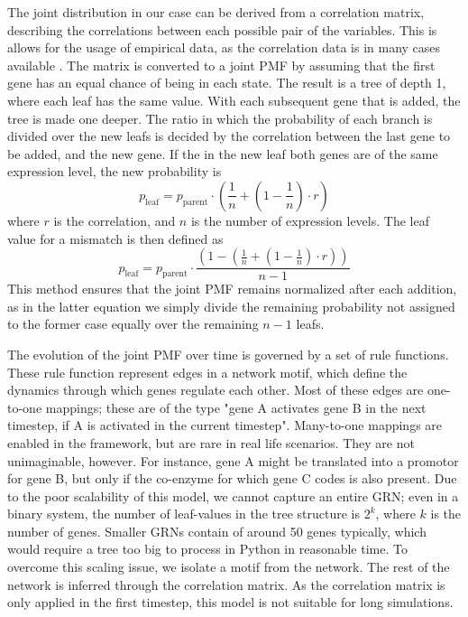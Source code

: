 \documentclass[../main.tex]{subfiles}
\begin{document}
The joint distribution in our case can be derived from a correlation matrix, describing the correlations between each possible pair of the variables.
This is allows for the usage of empirical data, as the correlation data is in many cases available \cite{}.
The matrix is converted to a joint PMF by assuming that the first gene has an equal chance of being in each state.
The result is a tree of depth 1, where each leaf has the same value.
With each subsequent gene that is added, the tree is made one deeper.
The ratio in which the probability of each branch is divided over the new leafs is decided by the correlation between the last gene to be added, and the new gene.
If the in the new leaf both genes are of the same expression level, the new probability is
%
\begin{equation}
    p_\mathrm{leaf} = p_\mathrm{parent} \cdot (\frac{1}{n} + (1 - \frac{1}{n}) \cdot r)
\end{equation}
%
where $r$ is the correlation, and $n$ is the number of expression levels.
The leaf value for a mismatch is then defined as
%
\begin{equation}
    p_\mathrm{leaf} = p_\mathrm{parent} \cdot \frac{(1 - (\frac{1}{n} + (1 - \frac{1}{n}) \cdot r))}{n-1} 
\end{equation}
%
This method ensures that the joint PMF remains normalized after each addition, as in the latter equation we simply divide the remaining probability not assigned to the former case equally over the remaining $n-1$ leafs.

The evolution of the joint PMF over time is governed by a set of rule functions.
These rule function represent edges in a network motif, which define the dynamics through which genes regulate each other.
Most of these edges are one-to-one mappings; these are of the type "gene A activates gene B in the next timestep, if A is activated in the current timestep".
Many-to-one mappings are enabled in the framework, but are rare in real life scenarios.
They are not unimaginable, however.
For instance, gene A might be translated into a promotor for gene B, but only if the co-enzyme for which gene C codes is also present.
Due to the poor scalability of this model, we cannot capture an entire GRN; even in a binary system, the number of leaf-values in the tree structure is $2^k$, where $k$ is the number of genes.
Smaller GRNs contain of around 50 genes typically, which would require a tree too big to process in Python in reasonable time.
To overcome this scaling issue, we isolate a motif from the network.
The rest of the network is inferred through the correlation matrix.
As the correlation matrix is only applied in the first timestep, this model is not suitable for long simulations.
\end{document}
